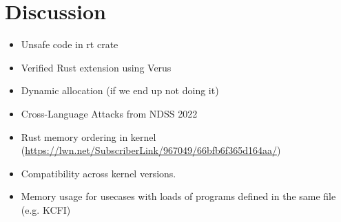 \section{Discussion}
\begin{itemize}
    \item Unsafe code in rt crate
    \item Verified Rust extension using Verus
    \item Dynamic allocation (if we end up not doing it)
    \item Cross-Language Attacks from NDSS 2022
    \item Rust memory ordering in kernel (\url{https://lwn.net/SubscriberLink/967049/66bfb6f365d164aa/})
    \item Compatibility \projname{} across kernel versions.
    \item Memory usage for usecases with loads of programs defined in the same
        file (e.g. KCFI)
\end{itemize}